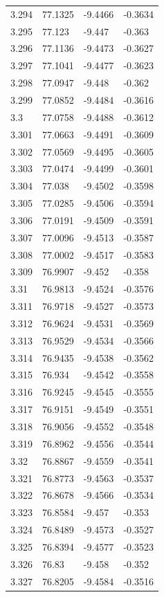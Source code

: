 \begin{tabular}{llll}
3.294 & 77.1325 & -9.4466 & -0.3634 \\
3.295 & 77.123 & -9.447 & -0.363 \\
3.296 & 77.1136 & -9.4473 & -0.3627 \\
3.297 & 77.1041 & -9.4477 & -0.3623 \\
3.298 & 77.0947 & -9.448 & -0.362 \\
3.299 & 77.0852 & -9.4484 & -0.3616 \\
3.3 & 77.0758 & -9.4488 & -0.3612 \\
3.301 & 77.0663 & -9.4491 & -0.3609 \\
3.302 & 77.0569 & -9.4495 & -0.3605 \\
3.303 & 77.0474 & -9.4499 & -0.3601 \\
3.304 & 77.038 & -9.4502 & -0.3598 \\
3.305 & 77.0285 & -9.4506 & -0.3594 \\
3.306 & 77.0191 & -9.4509 & -0.3591 \\
3.307 & 77.0096 & -9.4513 & -0.3587 \\
3.308 & 77.0002 & -9.4517 & -0.3583 \\
3.309 & 76.9907 & -9.452 & -0.358 \\
3.31 & 76.9813 & -9.4524 & -0.3576 \\
3.311 & 76.9718 & -9.4527 & -0.3573 \\
3.312 & 76.9624 & -9.4531 & -0.3569 \\
3.313 & 76.9529 & -9.4534 & -0.3566 \\
3.314 & 76.9435 & -9.4538 & -0.3562 \\
3.315 & 76.934 & -9.4542 & -0.3558 \\
3.316 & 76.9245 & -9.4545 & -0.3555 \\
3.317 & 76.9151 & -9.4549 & -0.3551 \\
3.318 & 76.9056 & -9.4552 & -0.3548 \\
3.319 & 76.8962 & -9.4556 & -0.3544 \\
3.32 & 76.8867 & -9.4559 & -0.3541 \\
3.321 & 76.8773 & -9.4563 & -0.3537 \\
3.322 & 76.8678 & -9.4566 & -0.3534 \\
3.323 & 76.8584 & -9.457 & -0.353 \\
3.324 & 76.8489 & -9.4573 & -0.3527 \\
3.325 & 76.8394 & -9.4577 & -0.3523 \\
3.326 & 76.83 & -9.458 & -0.352 \\
3.327 & 76.8205 & -9.4584 & -0.3516 \\

\end{tabular}
